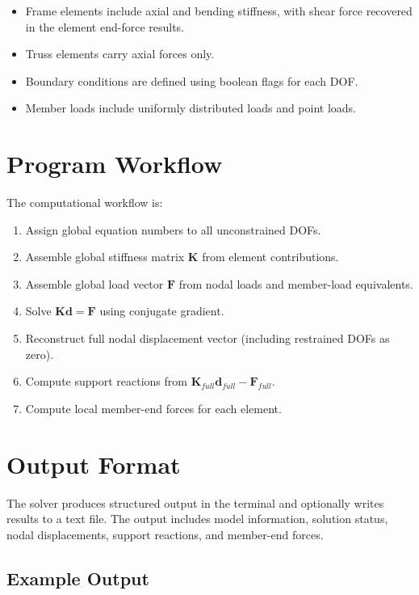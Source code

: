 \begin{itemize}
    \item Frame elements include axial and bending stiffness, with shear force recovered in the element end-force results.
    \item Truss elements carry axial forces only.
    \item Boundary conditions are defined using boolean flags for each DOF.
    \item Member loads include uniformly distributed loads and point loads.
\end{itemize}

\section{Program Workflow}
The computational workflow is:
\begin{enumerate}
    \item Assign global equation numbers to all unconstrained DOFs.
    \item Assemble global stiffness matrix \(\mathbf{K}\) from element contributions.
    \item Assemble global load vector \(\mathbf{F}\) from nodal loads and member-load equivalents.
    \item Solve \(\mathbf{K}\mathbf{d}=\mathbf{F}\) using conjugate gradient.
    \item Reconstruct full nodal displacement vector (including restrained DOFs as zero).
    \item Compute support reactions from \(\mathbf{K}_{full}\mathbf{d}_{full}-\mathbf{F}_{full}\).
    \item Compute local member-end forces for each element.
\end{enumerate}

\section{Output Format}

The solver produces structured output in the terminal and optionally writes results to a text file. The output includes model information, solution status, nodal displacements, support reactions, and member-end forces.

\subsection*{Example Output}

